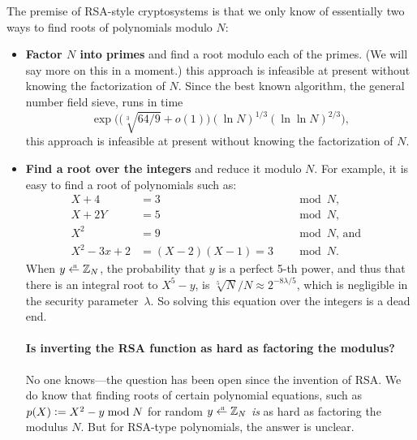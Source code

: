 The premise of RSA-style cryptosystems is that we only
know of essentially two ways to find roots of polynomials modulo $N$:
\begin{itemize}
\item \textbf{Factor $N$ into primes} and find a root modulo each of the primes.
      (We will say more on this in a moment.)
      this approach is infeasible at present without knowing the factorization of $N$.
Since the best known algorithm, the general number field sieve, runs in
time
\[ \exp\Big( \big(\sqrt[3]{64/9} + o(1)\big)
   (\ln N)^{1/3} (\ln \ln N)^{2/3} \Big), \]
this approach is infeasible at present without knowing the
factorization of $N$.

\item \textbf{Find a root over the integers} and reduce it modulo $N$.
      For example, it is easy to find a root of polynomials such as:\\
\begin{align*}
  X + 4 &= 3 &&\mod N,&\\
  X + 2Y &= 5 &&\mod N,&\\
  X^2 &= 9 &&\mod N\text{, and}&\\
  X^2-3x+2 &= (X-2)(X-1) = 3 &&\mod N.
\end{align*}
When $y \getsr \Z_N$, the probability that $y$ is a perfect
5-th power, and thus that there is an integral root to $X^5 - y$,
is $\sqrt[5]{N}/N \approx 2^{-8\lambda/5}$, which is negligible
in the security parameter~$\lambda$.
So solving this equation over the integers is a dead end.

\paragraph{Is inverting the RSA function as hard as factoring the modulus?}
No one knows---the question has been open since the invention of RSA.
We do know that finding roots of certain polynomial equations, such as
$p(X) \mathrel{\mathop:}= X^2 - y \bmod N$ for random $y \getsr \Z_N$ \emph{is} as 
hard as factoring the modulus $N$.
But for RSA-type polynomials, the answer is unclear.

\end{itemize}

